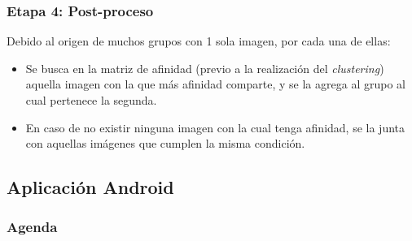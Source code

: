 \begin{frame}[t,fragile]
\frametitle {Etapa 4: Post-proceso}
Debido al origen de muchos grupos con 1 sola imagen, por cada una de ellas:
\begin{itemize}
	\item Se busca en la matriz de afinidad (previo a la realización del \textit{clustering}) aquella imagen con la que más afinidad comparte, y se la agrega al grupo al cual pertenece la segunda.
	\vspace{6mm}
	\item En caso de no existir ninguna imagen con la cual tenga afinidad, se la junta con aquellas imágenes que cumplen la misma condición.
\end{itemize}

\end{frame}

\subsection{Aplicación Android}

\watermarkon
\begin{frame}
	\frametitle{Agenda}
	
\end{frame}
\watermarkoff

